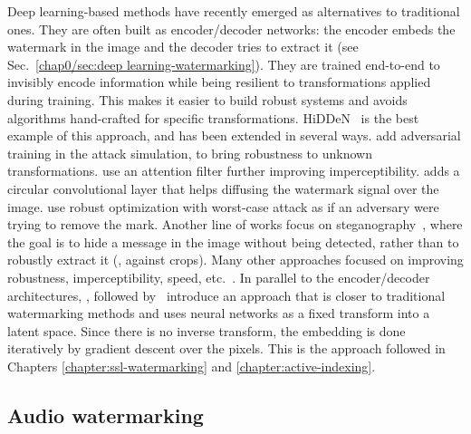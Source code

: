 Deep learning-based methods have recently emerged as alternatives to traditional ones.
They are often built as encoder/decoder networks: the encoder embeds the watermark in the image and the decoder tries to extract it (see Sec.~\ref{chap0/sec:deep learning-watermarking}).
They are trained end-to-end to invisibly encode information while being resilient to transformations applied during training. 
This makes it easier to build robust systems and avoids algorithms hand-crafted for specific transformations.
\Gls*{HiDDeN}~\citep{zhu2018hidden} is the best example of this approach, and has been extended in several ways.
\cite{luo2020distortion} add adversarial training in the attack simulation, to bring robustness to unknown transformations.
\cite{zhang2019robust, zhang2020robust, yu2020attention} use an attention filter further improving imperceptibility.
\cite{ahmadi2020redmark} adds a circular convolutional layer that helps diffusing the watermark signal over the image.
\cite{wen2019romark} use robust optimization with worst-case attack as if an adversary were trying to remove the mark.
Another line of works focus on \gls*{steganography}~\citep{baluja2017hiding, wengrowski2019light, zhang2019steganogan, tancik2020stegastamp, jing2021hinet, ma2022towards}, where the goal is to hide a message in the image without being detected, rather than to robustly extract it (\eg, against crops).
Many other approaches focused on improving robustness, imperceptibility, speed, etc.~\citep{jia2021mbrs, bui2023rosteals, bui2023trustmark, huang2023arwgan, evennou2024swift, pan2024jigmark}.
In parallel to the encoder/decoder architectures, \cite{vukotic2018deep,vukotic2020classification}, followed by~\cite{kishore2021fixed} introduce an approach that is closer to traditional watermarking methods and uses neural networks as a fixed transform into a latent space.
Since there is no inverse transform, the embedding is done iteratively by gradient descent over the pixels.
This is the approach followed in Chapters \ref{chapter:ssl-watermarking} and \ref{chapter:active-indexing}.



\subsection{Audio watermarking}

